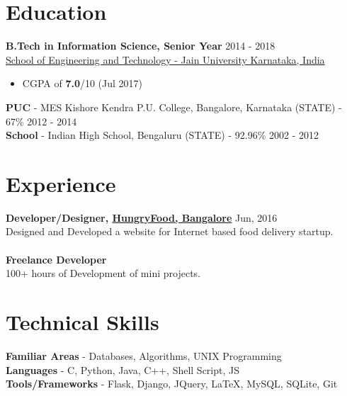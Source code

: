 \documentclass[margin, centered]{res}
\begin{document}
\begin{resume}

\section{Education}
\textbf{B.Tech in Information Science, Senior Year} \hfill 2014 - 2018 \\
\href{https://set.jainuniversity.ac.in/}{School of Engineering and Technology - Jain University Karnataka, India}
\begin{itemize}
 \item CGPA of \textbf{7.0}/10 (Jul 2017)
\end{itemize}
\textbf{PUC} - {MES Kishore Kendra P.U. College, Bangalore, Karnataka} (STATE) - 67\% \hfill 2012 - 2014 \\
\textbf{School} - Indian High School, Bengaluru (STATE) - 92.96\% \hfill 2002 - 2012
 
\section{Experience}
\textbf{Developer/Designer, \href{http://www.hungryfood.com/}{HungryFood, Bangalore}} \hfill Jun, 2016 \\
Designed and Developed a website for Internet based food delivery startup. \\
\\
\textbf{Freelance Developer} \hfill  \\
100+ hours of Development of mini projects.


\section{Technical \hspace{2mm} Skills}
\textbf{Familiar Areas} - Databases, Algorithms, UNIX Programming \\
\textbf{Languages} - C, Python, Java, C++, Shell Script, JS\\
\textbf{Tools/Frameworks} - Flask, Django, JQuery, \LaTeX, MySQL, SQLite, Git


\end{resume}
\end{document}
